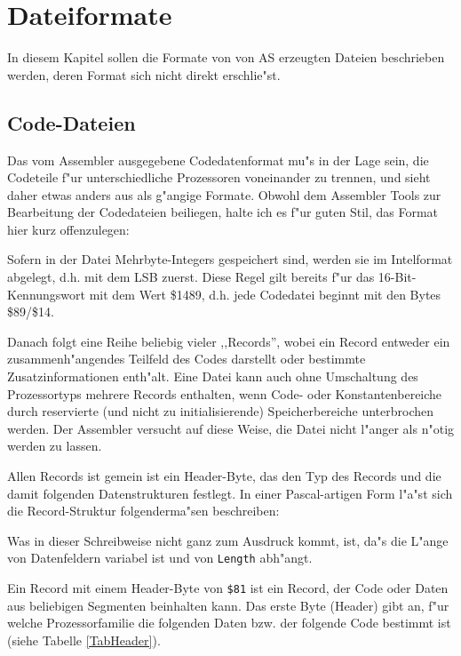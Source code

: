 \documentclass[12pt,a4paper,twoside]{report}
\newcommand{\asname}{AS}
\begin{document}

\cleardoublepage
\chapter{Dateiformate}

In diesem Kapitel sollen die Formate von von \asname{} erzeugten Dateien
beschrieben werden, deren Format sich nicht direkt erschlie"st.

\section{Code-Dateien}
\label{SectCodeFormat}

Das vom Assembler ausgegebene Codedatenformat mu"s in der Lage sein,
die Codeteile f"ur unterschiedliche Prozessoren voneinander zu trennen,
und sieht daher etwas anders aus als g"angige Formate.  Obwohl dem
Assembler Tools zur Bearbeitung der Codedateien beiliegen, halte ich es
f"ur guten Stil, das Format hier kurz offenzulegen:
\par
Sofern in der Datei Mehrbyte-Integers gespeichert sind, werden sie
im Intelformat abgelegt, d.h. mit dem LSB zuerst.  Diese Regel gilt
bereits f"ur das 16-Bit-Kennungswort mit dem Wert \$1489, d.h. jede
Codedatei beginnt mit den Bytes \$89/\$14.
\par
Danach folgt eine Reihe beliebig vieler ,,Records'', wobei ein Record
entweder ein zusammenh"angendes Teilfeld des Codes darstellt oder bestimmte
Zusatzinformationen enth"alt.  Eine Datei
kann auch ohne Umschaltung des Prozessortyps mehrere Records enthalten,
wenn Code- oder Konstantenbereiche durch reservierte (und nicht zu
initialisierende) Speicherbereiche unterbrochen werden.  Der Assembler
versucht auf diese Weise, die Datei nicht l"anger als n"otig werden
zu lassen.
\par
Allen Records ist gemein ist ein Header-Byte, das den Typ des Records
und die damit folgenden Datenstrukturen festlegt.  In einer Pascal-artigen
Form l"a"st sich die Record-Struktur folgenderma"sen beschreiben:

Was in dieser Schreibweise nicht ganz zum Ausdruck kommt, ist, da"s
die L"ange von Datenfeldern variabel ist und von {\tt Length} abh"angt.
\par
Ein Record mit einem Header-Byte von \verb!$81! ist ein Record, der Code
oder Daten aus beliebigen Segmenten beinhalten kann.  Das erste
Byte (Header) gibt an, f"ur welche Prozessorfamilie die folgenden
Daten bzw. der folgende  Code bestimmt ist (siehe Tabelle \ref{TabHeader}).
\end{document}
